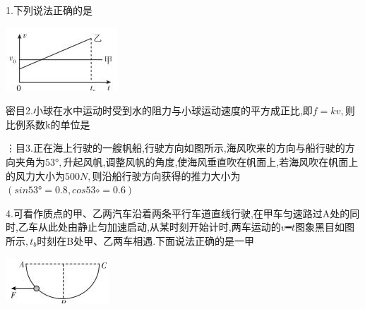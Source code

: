 \question[6]1.下列说法正确的是
\begin{center}
\includegraphics[]{img/image1.jpeg}
\end{center}

\begin{solution}{4cm}

\end{solution}



\question[6]密目2.小球在水中运动时受到水的阻力与小球运动速度的平方成正比,即$f=kv,$则比例系数k的单位是
\begin{solution}{4cm}

\end{solution}



\question[6]⋮目3.正在海上行驶的一艘帆船,行驶方向如图所示,海风吹来的方向与船行驶的方向夹角为$53°,$升起风帆,调整风帆的角度,使海风垂直吹在帆面上,若海风吹在帆面上的风力大小为$500N,$则沿船行驶方向获得的推力大小为$(sin53°=0.8,cos53∘=0.6)$


\begin{solution}{4cm}

\end{solution}



\question[6]4.可看作质点的甲、乙两汽车沿着两条平行车道直线行驶,在甲车匀速路过A处的同时,乙车从此处由静止匀加速启动,从某时刻开始计时,两车运动的$v━t$图象黑目如图所示$,t_b$时刻在B处甲、乙两车相遇.下面说法正确的是一甲
\begin{center}
\includegraphics[]{img/image4.jpeg}
\end{center}

\begin{solution}{4cm}

\end{solution}



